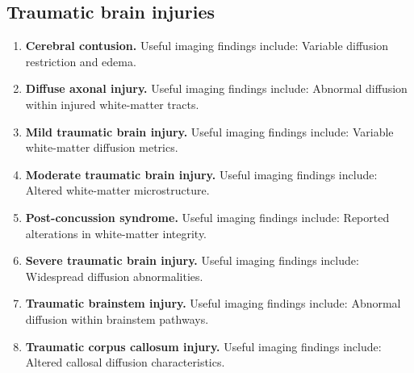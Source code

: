\subsection{Traumatic brain injuries}
\begin{enumerate}[leftmargin=*,itemsep=0.45em,topsep=0.4em]
\item \textbf{Cerebral contusion.} Useful imaging findings include: Variable diffusion restriction and edema.
\item \textbf{Diffuse axonal injury.} Useful imaging findings include: Abnormal diffusion within injured white-matter tracts.
\item \textbf{Mild traumatic brain injury.} Useful imaging findings include: Variable white-matter diffusion metrics.
\item \textbf{Moderate traumatic brain injury.} Useful imaging findings include: Altered white-matter microstructure.
\item \textbf{Post-concussion syndrome.} Useful imaging findings include: Reported alterations in white-matter integrity.
\item \textbf{Severe traumatic brain injury.} Useful imaging findings include: Widespread diffusion abnormalities.
\item \textbf{Traumatic brainstem injury.} Useful imaging findings include: Abnormal diffusion within brainstem pathways.
\item \textbf{Traumatic corpus callosum injury.} Useful imaging findings include: Altered callosal diffusion characteristics.
\end{enumerate}

